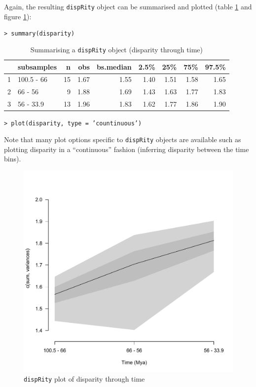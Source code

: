 \documentclass[12pt,letterpaper]{article}
\newcommand{\disp}{\texttt{dispRity} }
\begin{document}
Again, the resulting \disp object can be summarised and plotted (table \ref{Tab:summary_time} and figure \ref{Fig:plot_time}):

\texttt{> summary(disparity)}

\begin{table}[ht]
\centering
\begin{tabular}{rlrrrrrrr}
  \hline
 & subsamples & n & obs & bs.median & 2.5\% & 25\% & 75\% & 97.5\% \\ 
  \hline
1 & 100.5 - 66 &  15 & 1.67 & 1.55 & 1.40 & 1.51 & 1.58 & 1.65 \\ 
  2 & 66 - 56 &   9 & 1.88 & 1.69 & 1.43 & 1.63 & 1.77 & 1.83 \\ 
  3 & 56 - 33.9 &  13 & 1.96 & 1.83 & 1.62 & 1.77 & 1.86 & 1.90 \\ 
   \hline
\end{tabular}
\caption{Summarising a \disp object (disparity through time)}
\label{Tab:summary_time}
\end{table}

\texttt{> plot(disparity, type = 'countinuous')}

\noindent Note that many plot options specific to \disp objects are available such as plotting disparity in a ``continuous'' fashion (inferring disparity between the time bins).

\begin{figure}[!htbp]
\centering
   \includegraphics[width=1\textwidth]{plot_example_time.pdf} 
\caption{\disp plot of disparity through time}
\label{Fig:plot_time}
\end{figure}
\end{document}
